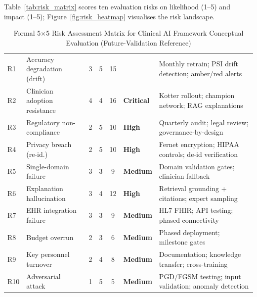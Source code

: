 Table~\ref{tab:risk_matrix} scores ten evaluation risks on likelihood (1--5) and impact (1--5); Figure~\ref{fig:risk_heatmap} visualises the risk landscape.

\begin{table}[!htbp]
\tablestripes\tablefontsize
\tablefontsize
\caption[Risk Assessment Matrix]{Formal 5$\times$5 Risk Assessment Matrix for Clinical AI Framework Conceptual Evaluation (Future-Validation Reference)}
\begin{tabularx}{\textwidth}{@{} p{0.4cm} >{\raggedright\arraybackslash}p{1.8cm} C C C >{\raggedright\arraybackslash}p{1.2cm} L @{}}
\toprule
{} &  &  &  &  &  &  \\
\midrule
R1 & Accuracy degradation (drift) & 3 & 5 & 15 &  & Monthly retrain; PSI drift detection; amber/red alerts \\
\addlinespace
R2 & Clinician adoption resistance & 4 & 4 & 16 & \textbf{Critical} & Kotter rollout; champion network; RAG explanations \\
\addlinespace
R3 & Regulatory non-compliance & 2 & 5 & 10 & \textbf{High} & Quarterly audit; legal review; governance-by-design \\
\addlinespace
R4 & Privacy breach (re-id.) & 2 & 5 & 10 & \textbf{High} & Fernet encryption; HIPAA controls; de-id verification \\
\addlinespace
R5 & Single-domain failure  & 3 & 3 & 9 & \textbf{Medium} & Domain validation gates; clinician fallback \\
\addlinespace
R6 & Explanation hallucination & 3 & 4 & 12 & \textbf{High} & Retrieval grounding + citations; expert sampling \\
\addlinespace
R7 & EHR integration failure & 3 & 3 & 9 & \textbf{Medium} & HL7 FHIR; API testing; phased connectivity \\
\addlinespace
R8 & Budget overrun & 2 & 3 & 6 & \textbf{Medium} & Phased deployment; milestone gates \\
\addlinespace
R9 & Key personnel turnover & 2 & 4 & 8 & \textbf{Medium} & Documentation; knowledge transfer; cross-training \\
\addlinespace
R10 & Adversarial attack & 1 & 5 & 5 & \textbf{Medium} & PGD/FGSM testing; input validation; anomaly detection \\
\bottomrule
\end{tabularx}
\end{table}

